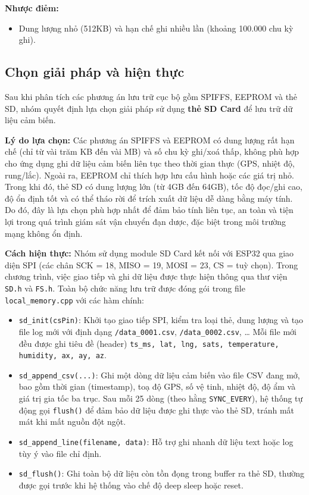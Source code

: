 \textbf{Nhược điẻm:}
\begin{itemize}
    \item Dung lượng nhỏ (512KB) và hạn chế ghi nhiều lần (khoảng 100.000 chu kỳ ghi).
\end{itemize}

\subsection{Chọn giải pháp và hiện thực}

Sau khi phân tích các phương án lưu trữ cục bộ gồm SPIFFS, EEPROM và thẻ SD, nhóm quyết định lựa chọn giải pháp sử dụng \textbf{thẻ SD Card} để lưu trữ dữ liệu cảm biến. 

\textbf{Lý do lựa chọn:}  
Các phương án SPIFFS và EEPROM có dung lượng rất hạn chế (chỉ từ vài trăm KB đến vài MB) và số chu kỳ ghi/xoá thấp, không phù hợp cho ứng dụng ghi dữ liệu cảm biến liên tục theo thời gian thực (GPS, nhiệt độ, rung/lắc). Ngoài ra, EEPROM chỉ thích hợp lưu cấu hình hoặc các giá trị nhỏ. Trong khi đó, thẻ SD có dung lượng lớn (từ 4GB đến 64GB), tốc độ đọc/ghi cao, độ ổn định tốt và có thể tháo rời để trích xuất dữ liệu dễ dàng bằng máy tính. Do đó, đây là lựa chọn phù hợp nhất để đảm bảo tính liên tục, an toàn và tiện lợi trong quá trình giám sát vận chuyển đạn dược, đặc biệt trong môi trường mạng không ổn định.

\textbf{Cách hiện thực:}  
Nhóm sử dụng module SD Card kết nối với ESP32 qua giao diện SPI (các chân SCK = 18, MISO = 19, MOSI = 23, CS = tuỳ chọn). Trong chương trình, việc giao tiếp và ghi dữ liệu được thực hiện thông qua thư viện \texttt{SD.h} và \texttt{FS.h}. Toàn bộ chức năng lưu trữ được đóng gói trong file \texttt{local\_memory.cpp} với các hàm chính:
\begin{itemize}
    \item \texttt{sd\_init(csPin)}: Khởi tạo giao tiếp SPI, kiểm tra loại thẻ, dung lượng và tạo file log mới với định dạng \texttt{/data\_0001.csv}, \texttt{/data\_0002.csv}, … Mỗi file mới đều được ghi tiêu đề (header) \texttt{ts\_ms, lat, lng, sats, temperature, humidity, ax, ay, az}.
    \item \texttt{sd\_append\_csv(...)}: Ghi một dòng dữ liệu cảm biến vào file CSV đang mở, bao gồm thời gian (timestamp), toạ độ GPS, số vệ tinh, nhiệt độ, độ ẩm và giá trị gia tốc ba trục. Sau mỗi 25 dòng (theo hằng \texttt{SYNC\_EVERY}), hệ thống tự động gọi \texttt{flush()} để đảm bảo dữ liệu được ghi thực vào thẻ SD, tránh mất mát khi mất nguồn đột ngột.
    \item \texttt{sd\_append\_line(filename, data)}: Hỗ trợ ghi nhanh dữ liệu text hoặc log tùy ý vào file chỉ định.
    \item \texttt{sd\_flush()}: Ghi toàn bộ dữ liệu còn tồn đọng trong buffer ra thẻ SD, thường được gọi trước khi hệ thống vào chế độ deep sleep hoặc reset.
\end{itemize}

